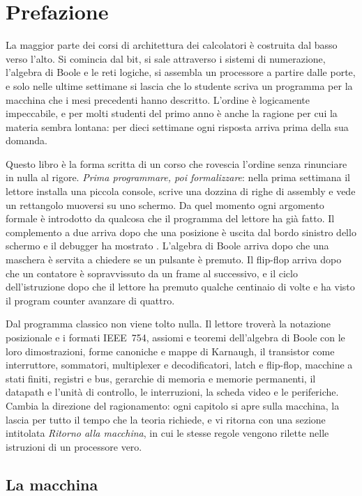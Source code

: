 \chapter{Prefazione}

La maggior parte dei corsi di architettura dei calcolatori è costruita dal
basso verso l'alto. Si comincia dal bit, si sale attraverso i sistemi di
numerazione, l'algebra di Boole e le reti logiche, si assembla un processore a
partire dalle porte, e solo nelle ultime settimane si lascia che lo studente
scriva un programma per la macchina che i mesi precedenti hanno descritto.
L'ordine è logicamente impeccabile, e per molti studenti del primo anno è anche
la ragione per cui la materia sembra lontana: per dieci settimane ogni risposta
arriva prima della sua domanda.

Questo libro è la forma scritta di un corso che rovescia l'ordine senza
rinunciare in nulla al rigore. \emph{Prima programmare, poi formalizzare}:
nella prima settimana il lettore installa una piccola console, scrive una
dozzina di righe di assembly \riscv e vede un rettangolo muoversi su uno
schermo. Da quel momento ogni argomento formale è introdotto da qualcosa che il
programma del lettore ha già fatto. Il complemento a due arriva dopo che una
posizione è uscita dal bordo sinistro dello schermo e il debugger ha mostrato
. L'algebra di Boole arriva dopo che una maschera è servita a
chiedere se un pulsante è premuto. Il flip-flop arriva dopo che un contatore è
sopravvissuto da un frame al successivo, e il ciclo dell'istruzione dopo che il
lettore ha premuto  qualche centinaio di volte e ha visto il program
counter avanzare di quattro.

Dal programma classico non viene tolto nulla. Il lettore troverà la notazione
posizionale e i formati IEEE~754, assiomi e teoremi dell'algebra di Boole con
le loro dimostrazioni, forme canoniche e mappe di Karnaugh, il transistor come
interruttore, sommatori, multiplexer e decodificatori, latch e flip-flop,
macchine a stati finiti, registri e bus, gerarchie di memoria e memorie
permanenti, il datapath e l'unità di controllo, le interruzioni, la scheda
video e le periferiche. Cambia la direzione del ragionamento: ogni capitolo si
apre sulla macchina, la lascia per tutto il tempo che la teoria richiede, e vi
ritorna con una sezione intitolata \emph{Ritorno alla macchina}, in cui le
stesse regole vengono rilette nelle istruzioni di un processore vero.

\section*{La macchina}

